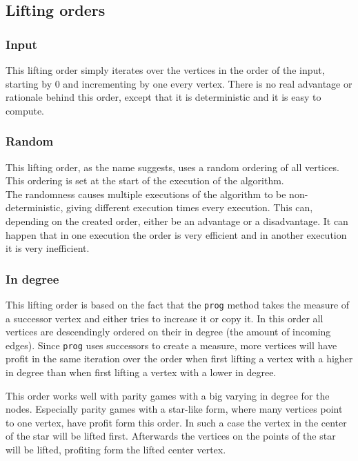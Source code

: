 \documentclass[10pt,a4paper]{article}
\begin{document}
\subsection{Lifting orders}

\subsubsection{Input}
This lifting order simply iterates over the vertices in the order of the input, starting by 0 and incrementing by one every vertex. There is no real advantage or rationale behind this order, except that it is deterministic and it is easy to compute.

\subsubsection{Random}
This lifting order, as the name suggests, uses a random ordering of all vertices. This ordering is set at the start of the execution of the algorithm.\\
The randomness causes multiple executions of the algorithm to be non-deterministic, giving different execution times every execution. This can, depending on the created order, either be an advantage or a disadvantage. It can happen that in one execution the order is very efficient and in another execution it is very inefficient.

\subsubsection{In degree}\label{indegree}
This lifting order is based on the fact that the \texttt{prog} method takes the measure of a successor vertex and either tries to increase it or copy it. In this order all vertices are descendingly ordered on their in degree (the amount of incoming edges). Since \texttt{prog} uses successors to create a measure, more vertices will have profit in the same iteration over the order when first lifting a vertex with a higher in degree than when first lifting a vertex with a lower in degree.


This order works well with parity games with a big varying in degree for the nodes. Especially parity games with a star-like form, where many vertices point to one vertex, have profit form this order. In such a case the vertex in the center of the star will be lifted first. Afterwards the vertices on the points of the star will be lifted, profiting form the lifted center vertex.
\end{document}
